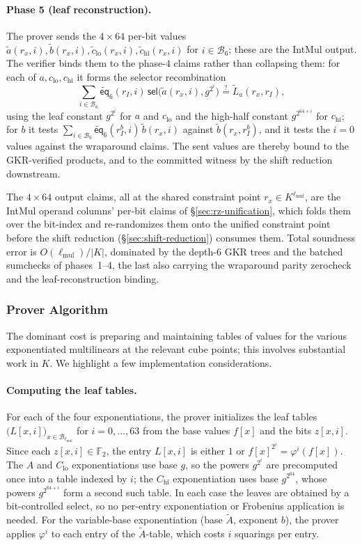 \documentclass{article}
\theoremstyle{definition}
\newcommand*{\mle}{\widetilde}
\newcommand{\eq}{\mathsf{eq}}
\newcommand{\BB}{\mathcal{B}}
\newcommand{\FF}[1]{\mathbb{F}_{#1}}
\newcommand{\sel}{\textsf{sel}}
\begin{document}
\paragraph{Phase 5 (leaf reconstruction).}
The prover sends the $4 \times 64$ per-bit values $\mle{a}(r_x, i), \mle{b}(r_x, i), \mle{c}_\text{lo}(r_x, i), \mle{c}_\text{hi}(r_x, i)$ for $i \in \BB_6$; these are the IntMul output. The verifier binds them to the phase-$4$ claims rather than collapsing them: for each of $a, c_\text{lo}, c_\text{hi}$ it forms the selector recombination
\[
  \sum_{i \in \BB_6} \mle{\eq}_6(r_I, i) \, \sel\bigl( \mle{a}(r_x, i), g^{2^i} \bigr) \stackrel{?}{=} \mle{L}_a(r_x, r_I),
\]
using the leaf constant $g^{2^i}$ for $a$ and $c_\text{lo}$ and the high-half constant $g^{2^{64 + i}}$ for $c_\text{hi}$; for $b$ it tests $\sum_{i \in \BB_6} \mle{\eq}_6(r_I^b, i) \, \mle{b}(r_x, i)$ against $\mle{b}(r_x, r_I^b)$, and it tests the $i = 0$ values against the wraparound claims. The sent values are thereby bound to the GKR-verified products, and to the committed witness by the shift reduction downstream.

The $4 \times 64$ output claims, all at the shared constraint point $r_x \in K^{\ell_\text{mul}}$, are the IntMul operand columns' per-bit claims of \S\ref{sec:rz-unification}, which folds them over the bit-index and re-randomizes them onto the unified constraint point before the shift reduction (\S\ref{sec:shift-reduction}) consumes them. Total soundness error is $O(\ell_\text{mul}) / |K|$, dominated by the depth-$6$ GKR trees and the batched sumchecks of phases~1--4, the last also carrying the wraparound parity zerocheck and the leaf-reconstruction binding.

\subsubsection{Prover Algorithm}
\label{sec:intmul-prover}

The dominant cost is preparing and maintaining tables of values for the various exponentiated multilinears at the relevant cube points; this involves substantial work in $K$. We highlight a few implementation considerations.

\paragraph{Computing the leaf tables.}
For each of the four exponentiations, the prover initializes the leaf tables $\bigl( L[x, i] \bigr)_{x \in \BB_{\ell_\text{mul}}}$ for $i = 0, \ldots, 63$ from the base values $f[x]$ and the bits $z[x, i]$. Since each $z[x, i] \in \FF{2}$, the entry $L[x, i]$ is either $1$ or $f[x]^{2^i} = \varphi^i(f[x])$. The $A$ and $C_\text{lo}$ exponentiations use base $g$, so the powers $g^{2^i}$ are precomputed once into a table indexed by $i$; the $C_\text{hi}$ exponentiation uses base $g^{2^{64}}$, whose powers $g^{2^{64 + i}}$ form a second such table. In each case the leaves are obtained by a bit-controlled select, so no per-entry exponentiation or Frobenius application is needed. For the variable-base exponentiation (base $\mle{A}$, exponent $b$), the prover applies $\varphi^i$ to each entry of the $\mle{A}$-table, which costs $i$ squarings per entry.
\end{document}
